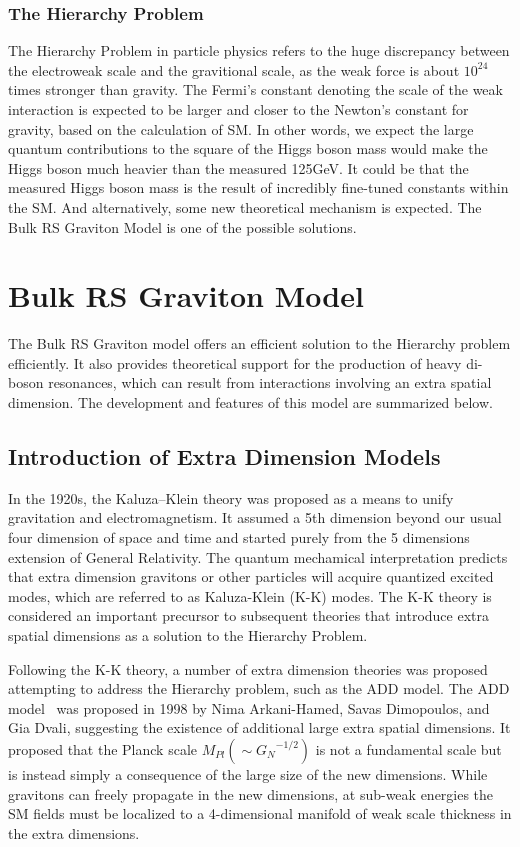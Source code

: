 \subsubsection{The Hierarchy Problem}
The Hierarchy Problem in particle physics refers to the huge discrepancy between the electroweak scale and the gravitional scale, as the weak force is about $10^{24}$ times stronger than gravity. The Fermi's constant denoting the scale of the weak interaction is expected to be larger and closer to the Newton's constant for gravity, based on the calculation of SM. In other words, we expect the large quantum contributions to the square of the Higgs boson mass would make the Higgs boson much heavier than the measured 125GeV. It could be that the measured Higgs boson mass is the result of incredibly fine-tuned constants within the SM. And alternatively, some new theoretical mechanism is expected. The Bulk RS Graviton Model is one of the possible solutions.

\section{Bulk RS Graviton Model}
The Bulk RS Graviton model offers an efficient solution to the Hierarchy problem efficiently. It also provides theoretical support for the production of heavy di-boson resonances, which can result from interactions involving an extra spatial dimension. The development and features of this model are summarized below.
\subsection{Introduction of Extra Dimension Models}
In the 1920s, the Kaluza–Klein theory was proposed as a means to unify gravitation and electromagnetism. It assumed a 5th dimension beyond our usual four dimension of space and time and started purely from the 5 dimensions extension of General Relativity. The quantum mechamical interpretation predicts that extra dimension gravitons or other particles will acquire quantized excited modes, which are referred to as Kaluza-Klein (K-K) modes. The K-K theory is considered an important precursor to subsequent theories that introduce extra spatial dimensions as a solution to the Hierarchy Problem.

\vspace{0.3cm}
Following the K-K theory, a number of extra dimension theories was proposed attempting to address the Hierarchy problem, such as the ADD model. The ADD model~\cite{Intro_ADD,Intro_ADD2} was proposed in 1998 by Nima Arkani-Hamed, Savas Dimopoulos, and Gia Dvali, suggesting the existence of additional large extra spatial dimensions. It proposed that the Planck scale $M_{Pl}(\sim{G_{N}}^{-1/2})$ is not a fundamental scale but is instead simply a consequence of the large size of the new dimensions. While gravitons can freely propagate in the new dimensions, at sub-weak energies the SM fields must be localized to a 4-dimensional manifold of weak scale thickness in the extra dimensions. 

